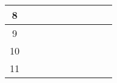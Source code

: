 \begin{table}[h]
\begin{tabular}{|c|c|c|c|c|c|c|c|c|c|}
8  &                          &                          &                          &                          & \cellcolor[HTML]{9B9B9B} & \cellcolor[HTML]{9B9B9B} & \cellcolor[HTML]{9B9B9B} & \cellcolor[HTML]{9B9B9B} &                          \\ \hline
9  &                          &                          &                          &                          &                          &                          &                          & \cellcolor[HTML]{9B9B9B} &                          \\ \hline
10 &                          &                          &                          &                          &                          &                          &                          & \cellcolor[HTML]{9B9B9B} & \cellcolor[HTML]{9B9B9B} \\ \hline
11 &                          &                          &                          &                          &                          &                          &                          &                          & \cellcolor[HTML]{9B9B9B} \\ \hline
\end{tabular}
\end{table}